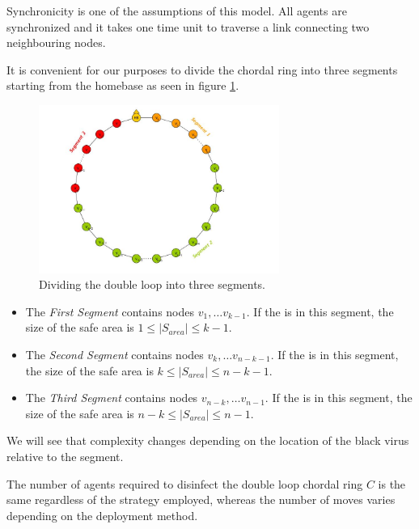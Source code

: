 Synchronicity is one of the assumptions of this model. All agents are synchronized and it takes one time unit  to traverse a link connecting two neighbouring nodes. 

It is convenient for our purposes  to  divide the chordal ring into  three segments starting from the homebase as seen in figure \ref{fig:dloop-seg}.  


\begin{figure}[H]
  \centering  
  \includegraphics[width=0.7\textwidth]{figures/dloop_seg.jpg}
  \caption{Dividing the double loop into three segments.}\label{fig:dloop-seg}
\end{figure}



\begin{itemize}

\item The {\em  First  Segment} contains nodes $v_1, \ldots v_{k-1}$.  If the \bv is in this segment, the size of the safe area is $1\leq |S_{area}| \leq k-1$.
\item The {\em Second  Segment} contains nodes $v_k, \ldots v_{n-k-1}$.   If the \bv is in this segment, the size of the safe area is $k\leq |S_{area}| \leq n-k-1$.
\item The {\em Third  Segment}  contains nodes $v_{n-k}, \ldots v_{n-1}$.   If the \bv is in this segment, the size of the safe area is $n-k\leq |S_{area}| \leq n-1$.
\end{itemize}

We will see that complexity changes depending on the  location of the black virus relative to the segment. 

The number of agents required to disinfect the double loop chordal ring $C$ is the same regardless of the strategy employed, whereas the number of moves varies depending on the deployment method.
 




